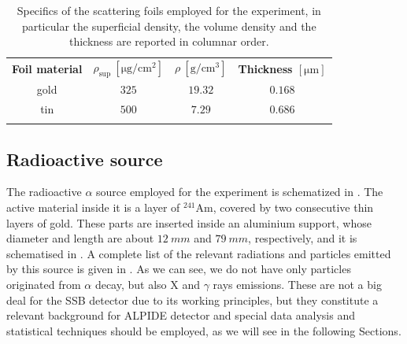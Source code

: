 \documentclass[../../main/main.tex]{subfiles}
\begin{document}
\begin{table}[!h]
    \centering
    \begin{tabular}{cccc}
        \toprule
        \textbf{Foil material}  &   \textbf{\boldmath\( \rho_{\mathrm{sup}} \ \mathrm{[\mu g/cm^{2}]} \)} &   \textbf{\boldmath\( \rho \ \mathrm{[g/cm^{3}]} \)}  &   \textbf{\boldmath Thickness \( \mathrm{[\mu m]} \)}  \\
        \colrule
        gold    &   \( 325 \)   &   \( 19.32 \) &   \( 0.168 \) \\
        tin     &   \( 500 \)   &   \(  7.29 \) &   \( 0.686 \) \\
        \botrule
    \end{tabular}
    \caption{Specifics of the scattering foils employed for the experiment, in particular the superficial density, the volume density and the thickness are reported in columnar order.}
    \label{tab:mechanics_foil_specifics}
\end{table}



\subsection{Radioactive source}
The radioactive \( \alpha \) source employed for the experiment is schematized in  \cite{source_ez}. The active material inside it is a layer of \( {}^{241}\mathrm{Am} \), covered by two consecutive thin layers of gold. These parts are inserted inside an aluminium support, whose diameter and length are about \( 12 \ \si{mm} \) and \( 79 \ \si{mm} \), respectively, and it is schematised in . A complete list of the relevant radiations and particles emitted by this source is given in  \cite{source_ddep}. As we can see, we do not have only particles originated from \( \alpha \) decay, but also X and \( \gamma \) rays emissions. These are not a big deal for the SSB detector due to its working principles, but they constitute a relevant background for ALPIDE detector and special data analysis and statistical techniques should be employed, as we will see in the following Sections.
\end{document}
